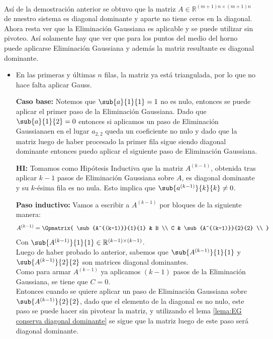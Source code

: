 \documentclass[12pt]{article}
\begin{document}
\paragraph{} Así de la demostración anterior se obtuvo que la matriz \(A \in \mathbb{R}^{(m+1)n \times (m+1)n}\) de nuestro sistema es diagonal dominante y aparte no tiene ceros en la diagonal. Ahora resta ver que la Eliminación Gaussiana es aplicable y se puede utilizar sin pivoteo. Así solamente hay que ver que para los puntos del medio del horno puede aplicarse Eliminación Gaussiana y además la matriz resultante es diagonal dominante. 

\begin{itemize}
\item En las primeras y últimas \(n\) filas, la matriz ya está triangulada, por lo que no hace falta aplicar Gauss.

\item[\textbf{Caso base:}] Notemos que \(\sub{a}{1}{1} = 1\) no es nulo, entonces se puede aplicar el primer paso de la Eliminación Gaussiana. Dado que \(\sub{a}{1}{2} =0\) entonces si aplicamos un paso de Eliminación Gaussianaen en el lugar $a_{2,2}$ queda un coeficiente no nulo y dado que la matriz luego de haber procesado la primer fila sigue siendo diagonal dominante entonces puedo aplicar el siguiente paso de Eliminación Gaussiana. %

\item[\textbf{HI:}] Tomamos como Hipótesis Inductiva que la matriz \(A^{(k-1)}\), obtenida tras aplicar \(k-1\) pasos de Eliminación Gaussiana sobre \(A\), es diagonal dominante y su \(k\)-ésima fila es no nula. Esto implica que \(\sub{a^{(k-1)}}{k}{k} \neq 0\).

\item[\textbf{Paso inductivo:}] Vamos a escribir a \(A^{(k-1)}\) por bloques de la siguiente manera:
\[
  A^{(k-1)} = \Gpmatrix{
    \sub{A^{(k-1)}}{1}{1} & B \\
    C & \sub{A^{(k-1)}}{2}{2} \\
  }
\]
Con \(\sub{A^{(k-1)}}{1}{1} \in \mathbb{R}^{(k-1) \times (k-1)}\). \\ %
Luego de haber probado lo anterior, sabemos que \(\sub{A^{(k-1)}}{1}{1}\) y \(\sub{A^{(k-1)}}{2}{2}\) son matrices diagonal dominantes. \\
Como para armar \(A^{(k-1)}\) ya aplicamos \((k-1)\) pasos de la Eliminación Gaussiana, se tiene que \(C = 0\). \\
Entonces cuando se quiere aplicar un paso de Eliminación Gaussiana sobre \(\sub{A^{(k-1)}}{2}{2}\), dado que el elemento de la diagonal es no nulo, este paso se puede hacer sin pivotear la matriz, y utilizando el lema \ref{lema:EG conserva diagonal dominante} se sigue que la matriz luego de este paso será diagonal dominante.


\end{itemize}
\end{document}
